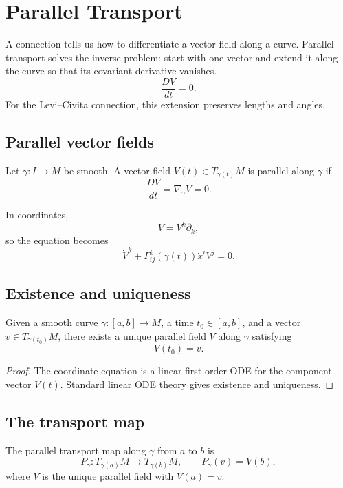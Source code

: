 \chapter{Parallel Transport}
\label{ch:vii24-parallel-transport}

A connection tells us how to differentiate a vector field along a curve.  Parallel
transport solves the inverse problem: start with one vector and extend it along the
curve so that its covariant derivative vanishes.
\[
\boxed{\frac{DV}{dt}=0.}
\]
For the Levi--Civita connection, this extension preserves lengths and angles.

\section{Parallel vector fields}

\begin{definition}\label{def:vii24-parallel}
Let \(\gamma:I\to M\) be smooth.  A vector field \(V(t)\in T_{\gamma(t)}M\) is
parallel along \(\gamma\) if
\[
\frac{DV}{dt}
=
\nabla_{\dot\gamma}V
=
0.
\]
\end{definition}

In coordinates,
\[
V=V^k\partial_k,
\]
so the equation becomes
\[
\dot V^k
+
\Gamma^k_{ij}(\gamma(t))\dot x^iV^j
=
0.
\]

\section{Existence and uniqueness}

\begin{theorem}\label{thm:vii24-ivp}
Given a smooth curve \(\gamma:[a,b]\to M\), a time \(t_0\in[a,b]\), and a vector
\(v\in T_{\gamma(t_0)}M\), there exists a unique parallel field \(V\) along
\(\gamma\) satisfying
\[
V(t_0)=v.
\]
\end{theorem}

\begin{proof}
The coordinate equation is a linear first-order ODE for the component vector
\(V(t)\). Standard linear ODE theory gives existence and uniqueness.
\end{proof}

\section{The transport map}

\begin{definition}\label{def:vii24-map}
The parallel transport map along \(\gamma\) from \(a\) to \(b\) is
\[
P_\gamma:T_{\gamma(a)}M\to T_{\gamma(b)}M,
\qquad
P_\gamma(v)=V(b),
\]
where \(V\) is the unique parallel field with \(V(a)=v\).
\end{definition}

